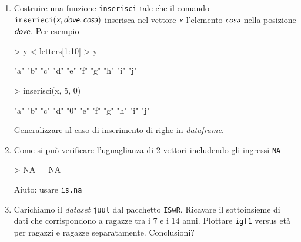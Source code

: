 \documentclass[onecolumn,12pt]{book}
\newcommand{\varia}[1]{\textsl{\textsf{#1}}}
\begin{document}
\begin{enumerate}
\item{} Costruire una funzione \texttt{inserisci} tale che il comando
$\texttt{inserisci}(\varia{x}, \varia{dove},\varia{cosa})$ inserisca nel vettore $\varia{x}$ l'elemento $\varia{cosa}$ nella posizione $\varia{dove}$.
Per esempio
\begin{Schunk}
\begin{Sinput}
> y <-letters[1:10]
> y
\end{Sinput}
\begin{Soutput}
 [1] "a" "b" "c" "d" "e" "f" "g" "h" "i" "j"
\end{Soutput}
\end{Schunk}
\begin{Schunk}
\begin{Sinput}
> inserisci(x, 5, 0)
\end{Sinput}
\end{Schunk}
\begin{Schunk}
\begin{Soutput}
 [1] "a" "b" "c" "d" "0" "e" "f" "g" "h" "i" "j"
\end{Soutput}
\end{Schunk}
Generalizzare  al caso di inserimento di righe in \emph{dataframe}.
\item{}
Come si pu\`o verificare l'uguaglianza di 2 vettori includendo gli ingressi \texttt{NA}
\begin{Schunk}
\begin{Sinput}
> NA==NA
\end{Sinput}
\end{Schunk}
Aiuto: usare \texttt{is.na}
\item{}\cite{dalgaard}
Carichiamo il \emph{dataset} \texttt{juul} dal pacchetto \texttt{ISwR}. Ricavare il sottoinsieme di dati che corrispondono a ragazze tra i 7 e i 14 anni. Plottare \texttt{igf1} versus et\`a per ragazzi e ragazze separatamente. Conclusioni?
\end{enumerate}
\end{document}
